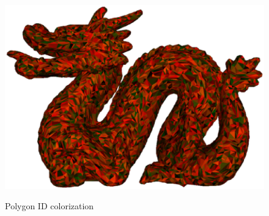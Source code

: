 \documentclass[a4paper,10pt,notitlepage]{scrreprt}
\begin{document}
\begin{figure}
{            \includegraphics[scale=0.4]{dragon-polygonid.eps} }

  \caption{Polygon ID colorization}
\end{figure}
\end{document}
